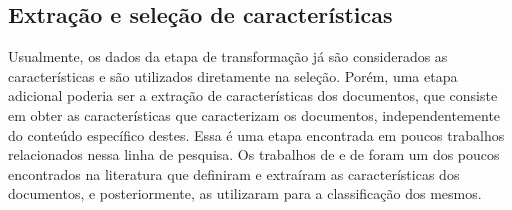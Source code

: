 \documentclass[template.tex]{subfiles}
\begin{document}
\subsection{Extração e seleção de características}

%
%
%
%
%



Usualmente, os dados da etapa de transformação já são considerados as características e são utilizados diretamente na seleção. Porém, uma etapa adicional poderia ser a extração de características dos documentos, que consiste em obter as características que caracterizam os documentos, independentemente do conteúdo específico destes. Essa é uma etapa encontrada em poucos trabalhos relacionados nessa linha de pesquisa. Os trabalhos de  e de  foram um dos poucos encontrados na literatura que definiram e extraíram as características dos documentos, e posteriormente, as utilizaram para a classificação dos mesmos.
\end{document}
